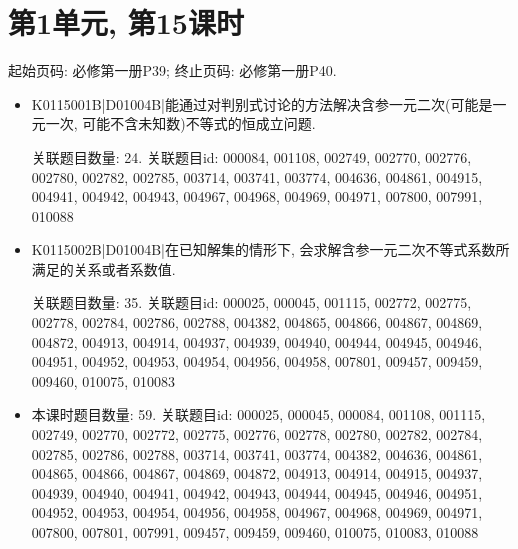 \section*{第1单元, 第15课时}
起始页码: 必修第一册P39; 终止页码: 必修第一册P40.
\begin{itemize}
\item K0115001B|D01004B|能通过对判别式讨论的方法解决含参一元二次(可能是一元一次, 可能不含未知数)不等式的恒成立问题.

关联题目数量: 24. 关联题目id: 000084, 001108, 002749, 002770, 002776, 002780, 002782, 002785, 003714, 003741, 003774, 004636, 004861, 004915, 004941, 004942, 004943, 004967, 004968, 004969, 004971, 007800, 007991, 010088

\item K0115002B|D01004B|在已知解集的情形下, 会求解含参一元二次不等式系数所满足的关系或者系数值.

关联题目数量: 35. 关联题目id: 000025, 000045, 001115, 002772, 002775, 002778, 002784, 002786, 002788, 004382, 004865, 004866, 004867, 004869, 004872, 004913, 004914, 004937, 004939, 004940, 004944, 004945, 004946, 004951, 004952, 004953, 004954, 004956, 004958, 007801, 009457, 009459, 009460, 010075, 010083

\item 本课时题目数量: 59. 关联题目id: 000025, 000045, 000084, 001108, 001115, 002749, 002770, 002772, 002775, 002776, 002778, 002780, 002782, 002784, 002785, 002786, 002788, 003714, 003741, 003774, 004382, 004636, 004861, 004865, 004866, 004867, 004869, 004872, 004913, 004914, 004915, 004937, 004939, 004940, 004941, 004942, 004943, 004944, 004945, 004946, 004951, 004952, 004953, 004954, 004956, 004958, 004967, 004968, 004969, 004971, 007800, 007801, 007991, 009457, 009459, 009460, 010075, 010083, 010088

\end{itemize}

